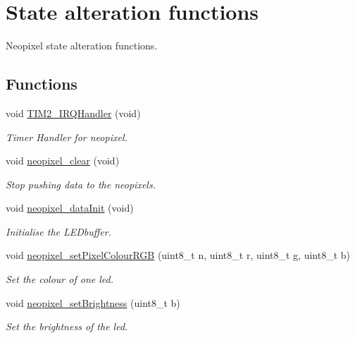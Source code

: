 \hypertarget{group___state}{}\section{State alteration functions}
\label{group___state}


Neopixel state alteration functions.  


\subsection*{Functions}
\begin{DoxyCompactItemize}
\item 
void \hyperlink{group___state_ga38ad4725462bdc5e86c4ead4f04b9fc2}{T\+I\+M2\+\_\+\+I\+R\+Q\+Handler} (void)
\begin{DoxyCompactList}\small\item\em Timer Handler for neopixel. \end{DoxyCompactList}\item 
void \hyperlink{group___state_ga8e3cfef785ce221672f825f8785c25b8}{neopixel\+\_\+clear} (void)
\begin{DoxyCompactList}\small\item\em Stop pushing data to the neopixels. \end{DoxyCompactList}\item 
void \hyperlink{group___state_ga79e34feddcfb2c45ae218166c84bdff4}{neopixel\+\_\+data\+Init} (void)
\begin{DoxyCompactList}\small\item\em Initialise the L\+E\+Dbuffer. \end{DoxyCompactList}\item 
void \hyperlink{group___state_ga63c196a71ffb007411929e41ba5df41d}{neopixel\+\_\+set\+Pixel\+Colour\+R\+GB} (uint8\+\_\+t n, uint8\+\_\+t r, uint8\+\_\+t g, uint8\+\_\+t b)
\begin{DoxyCompactList}\small\item\em Set the colour of one led. \end{DoxyCompactList}\item 
void \hyperlink{group___state_gae027558106eef5c81996294f4561fecb}{neopixel\+\_\+set\+Brightness} (uint8\+\_\+t b)
\begin{DoxyCompactList}\small\item\em Set the brightness of the led. \end{DoxyCompactList}\end{DoxyCompactItemize}



